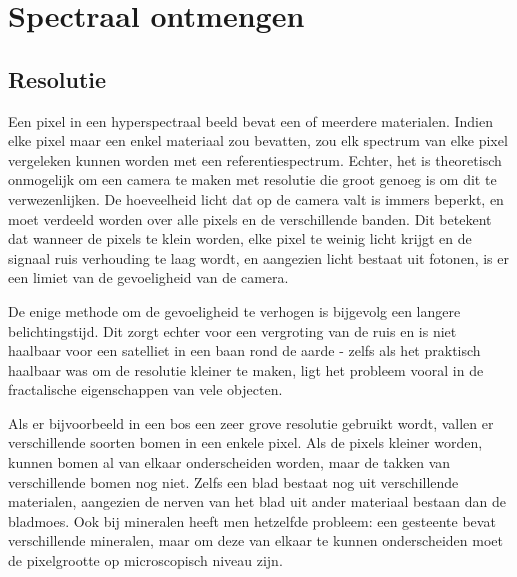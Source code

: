 \documentclass[12pt]{report}
\begin{document}
\chapter{Spectraal ontmengen}




\section{Resolutie}

Een pixel in een hyperspectraal beeld bevat een of meerdere materialen. Indien elke pixel maar een enkel materiaal zou bevatten, zou elk spectrum van elke pixel vergeleken kunnen worden met een referentiespectrum. Echter, het is theoretisch onmogelijk om een camera te maken met resolutie die groot genoeg is om dit te verwezenlijken. De hoeveelheid licht dat op de camera valt is immers beperkt, en moet verdeeld worden over alle pixels en de verschillende banden. Dit betekent dat wanneer de pixels te klein worden, elke pixel te weinig licht krijgt en de signaal ruis verhouding te laag wordt, en aangezien licht bestaat uit fotonen, is er een limiet van de gevoeligheid van de camera. 

De enige methode om de gevoeligheid te verhogen is bijgevolg een langere belichtingstijd. Dit zorgt echter voor een vergroting van de ruis en is niet haalbaar voor een satelliet in een baan rond de aarde - zelfs als het praktisch haalbaar was om de resolutie kleiner te maken, ligt het probleem vooral in de fractalische eigenschappen van vele objecten. 

Als er bijvoorbeeld in een bos een zeer grove resolutie gebruikt wordt, vallen er verschillende soorten bomen in een enkele pixel. Als de pixels kleiner worden, kunnen bomen al van elkaar onderscheiden worden, maar de takken van verschillende bomen nog niet. Zelfs een blad bestaat nog uit verschillende materialen, aangezien de nerven van het blad uit ander materiaal bestaan dan de bladmoes. Ook bij mineralen heeft men hetzelfde probleem: een gesteente bevat verschillende mineralen, maar om deze van elkaar te kunnen onderscheiden moet de pixelgrootte op microscopisch niveau zijn. 
\end{document}
